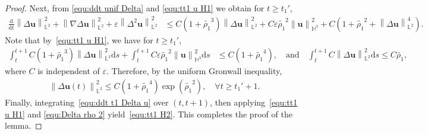 \documentclass[11pt, reqno]{amsart}
\theoremstyle{definition}
\numberwithin{equation}{section}
\newcommand{\bff}{\boldsymbol}
\newcommand{\bb}{\mathbb}
\newcommand{\ddt}{\frac{\mathrm{d}}{\mathrm{d}t}}
\newcommand{\ds}{\mathrm{d}s}
\newcommand{\norm}[2]{\left\|{#1}\right\|_{#2}}
\begin{document}
\begin{proof}
Next, from \eqref{equ:ddt unif Delta} and \eqref{equ:tt1 u H1} we obtain for $t\geq t_1'$,
\begin{align}\label{equ:ddt t1 Delta u}
    \ddt \norm{\Delta \bff{u}}{\bb{L}^2}^2
    +
    \norm{\nabla \Delta\bff{u}}{\bb{L}^2}^2
    +
    \varepsilon \norm{\Delta^2 \bff{u}}{\bb{L}^2}^2
    &\leq
    C\left(1+ \widetilde{\rho_1}^3 \right) \norm{\Delta \bff{u}}{\bb{L}^2}^2
    +
    C\varepsilon \widetilde{\rho_1}^2 \norm{\bff{u}}{\bb{H}^3}^2
    +
    C\left(1+ \widetilde{\rho_1}^2 + \norm{\Delta \bff{u}}{\bb{L}^2}^4 \right).
\end{align}
Note that by~\eqref{equ:tt1 u H1}, we have for $t\geq t_1'$,
\begin{align*}
    \int_t^{t+1} C\left(1+ \widetilde{\rho_1}^3 \right) \norm{\Delta \bff{u}}{\bb{L}^2}^2 \ds
    +
    \int_t^{t+1} C\varepsilon \widetilde{\rho_1}^2 \norm{\bff{u}}{\bb{H}^3}^2 \ds 
    &\leq
    C\left(1+\widetilde{\rho_1}^4 \right), \quad \text{and} \quad
    \int_t^{t+1} C\norm{\Delta \bff{u}}{\bb{L}^2}^2 \ds
    \leq
    C\widetilde{\rho_1},
\end{align*}
where $C$ is independent of $\varepsilon$. Therefore, by the uniform Gronwall inequality,
\begin{align}\label{equ:Delta rho 2}
    \norm{\Delta \bff{u}(t)}{\bb{L}^2}^2 \leq C \left(1+\widetilde{\rho_1}^4 \right) \exp\left(\widetilde{\rho_1}^2\right),
    \quad \forall t\geq t_1'+1.
\end{align}
Finally, integrating~\eqref{equ:ddt t1 Delta u} over $(t,t+1)$, then applying~\eqref{equ:tt1 u H1} and \eqref{equ:Delta rho 2} yield~\eqref{equ:tt1 H2}.
This completes the proof of the lemma.
\end{proof}
\end{document}
